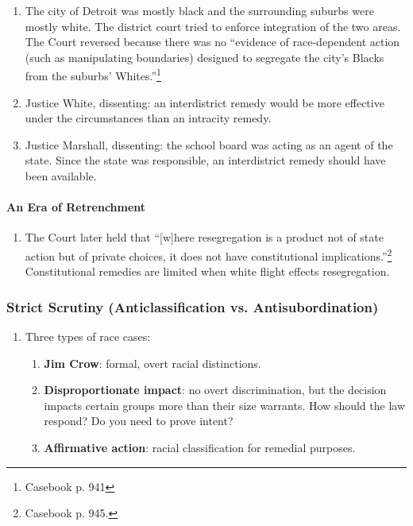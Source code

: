\begin{enumerate}
    \item The city of Detroit was mostly black and the surrounding suburbs 
    were mostly white. The district court tried to enforce integration of the 
    two areas. The Court reversed because there was no ``evidence of 
    race-dependent action (such as manipulating boundaries) designed to 
    segregate the city's Blacks from the suburbs' Whites.''\footnote{Casebook 
    p. 941}
    \item Justice White, dissenting: an interdistrict remedy would be more 
    effective under the circumstances than an intracity remedy.
    \item Justice Marshall, dissenting: the school board was acting as an 
    agent of the state. Since the state was responsible, an interdistrict 
    remedy should have been available.
\end{enumerate}

\paragraph{An Era of Retrenchment}

\begin{enumerate}
    \item The Court later held that ``[w]here resegregation is a product not 
    of state action but of private choices, it does not have constitutional 
    implications.''\footnote{Casebook p. 945.} Constitutional remedies are 
    limited when white flight effects resegregation.
\end{enumerate}

\subsubsection{Strict Scrutiny (Anticlassification vs. Antisubordination)}

\begin{enumerate}
    \item Three types of race cases:
    \begin{enumerate}
        \item \textbf{Jim Crow}: formal, overt racial distinctions.
        \item \textbf{Disproportionate impact}: no overt discrimination, but 
        the decision impacts certain groups more than their size warrants. How 
        should the law respond? Do you need to prove intent?
        \item \textbf{Affirmative action}: racial classification for remedial 
        purposes.
    \end{enumerate}
\end{enumerate}

